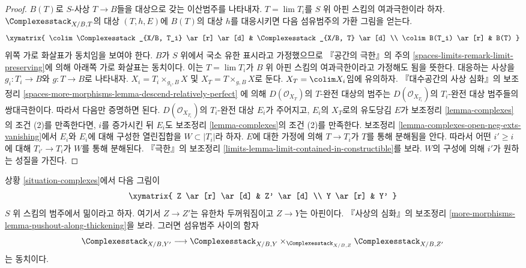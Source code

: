 \begin{proof}
$B(T)$로 $S$-사상 $T \to B$들을 대상으로 갖는 이산범주를 나타내자.
$T = \lim T_i$를 $S$ 위 아핀 스킴의 여과극한이라 하자.
$\Complexesstack_{X/B, T}$의 대상 $(T, h, E)$에 $B(T)$의 대상 $h$를 대응시키면
다음 섬유범주의 가환 그림을 얻는다.
$$
\xymatrix{
\colim \Complexesstack_{X/B, T_i} \ar[r] \ar[d] &
\Complexesstack_{X/B, T} \ar[d] \\
\colim B(T_i) \ar[r] & B(T)
}
$$
위쪽 가로 화살표가 동치임을 보여야 한다.
$B$가 $S$ 위에서 국소 유한 표시라고 가정했으므로 『공간의 극한』의 주의
\ref{spaces-limits-remark-limit-preserving}에 의해 아래쪽 가로 화살표는 동치이다.
이는 $T = \lim T_i$가 $B$ 위 아핀 스킴의 여과극한이라고 가정해도 됨을 뜻한다.
대응하는 사상을 $g_i : T_i \to B$와 $g : T \to B$로 나타내자.
$X_i = T_i \times_{g_i, B} X$ 및 $X_T = T \times_{g, B} X$로 둔다.
$X_T = \colim X_i$임에 유의하자. 『대수공간의 사상 심화』의 보조정리
\ref{spaces-more-morphisms-lemma-descend-relatively-perfect}
에 의해 $D(\mathcal{O}_{X_T})$의 $T$-완전 대상의 범주는
$D(\mathcal{O}_{X_{T_i}})$의 $T_i$-완전 대상 범주들의 쌍대극한이다.
따라서 다음만 증명하면 된다.
$D(\mathcal{O}_{X_{T_i}})$의 $T_i$-완전 대상 $E_i$가 주어지고, $E_i$의
$X_T$로의 유도당김 $E$가 보조정리 \ref{lemma-complexes}의 조건 (2)를
만족한다면, $i$를 증가시킨 뒤 $E_i$도 보조정리 \ref{lemma-complexes}의
조건 (2)를 만족한다. 보조정리
\ref{lemma-complexes-open-neg-exts-vanishing}에서 $E_i$와 $E_i$에 대해 구성한
열린집합을 $W \subset |T_i|$라 하자. $E$에 대한 가정에 의해
$T \to T_i$가 $T$를 통해 분해됨을 안다. 따라서 어떤 $i' \geq i$에 대해
$T_{i'} \to T_i$가 $W$를 통해 분해된다. 『극한』의 보조정리
\ref{limits-lemma-limit-contained-in-constructible}를 보라. $W$의 구성에 의해
$i'$가 원하는 성질을 가진다.
\end{proof}

\begin{lemma}
\label{lemma-complexes-RS-star}
상황 \ref{situation-complexes}에서 다음 그림이
$$
\xymatrix{
Z \ar[r] \ar[d] & Z' \ar[d] \\
Y \ar[r] & Y'
}
$$
$S$ 위 스킴의 범주에서 밂이라고 하자. 여기서 $Z \to Z'$는 유한차 두꺼워짐이고
$Z \to Y$는 아핀이다. 『사상의 심화』의 보조정리
\ref{more-morphisms-lemma-pushout-along-thickening}을 보라. 그러면 섬유범주
사이의 함자
$$
\Complexesstack_{X/B, Y'}
\longrightarrow
\Complexesstack_{X/B, Y}
\times_{\Complexesstack_{X/B, Z}}
\Complexesstack_{X/B, Z'}
$$
는 동치이다.
\end{lemma}

